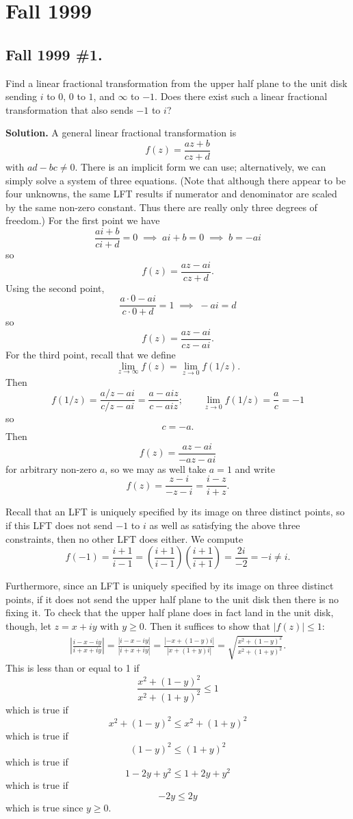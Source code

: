 \documentclass[10pt]{article}
\numberwithin{equation}{subsection}
\begin{document}
\newpage
\section{Fall 1999}

\subsection{Fall 1999 \#1.}

Find a linear fractional transformation from the upper half plane to the unit
disk sending $i$ to $0$, $0$ to $1$, and $\infty$ to $-1$.  Does there exist
such a linear fractional transformation that also sends $-1$ to $i$?

\textbf{Solution.}  A general linear fractional transformation is
$$
	f(z) = \frac{az+b}{cz+d}
$$
with $ad-bc\ne 0$.  There is an implicit form we can use; alternatively, we can
simply solve a system of three equations.  (Note that although there appear to
be four unknowns, the same LFT results if numerator and denominator are scaled
by the same non-zero constant.  Thus there are really only three degrees of
freedom.)  For the first point we have
$$
	\frac{ai+b}{ci+d} = 0 \;\implies\;
	ai+b = 0 \;\implies\;
	b = -ai
$$
so
$$
	f(z) = \frac{az-ai}{cz+d}.
$$
Using the second point,
$$
	\frac{a\cdot 0-ai}{c\cdot 0+d} = 1 \;\implies\;
	-ai = d
$$
so
$$
	f(z) = \frac{az-ai}{cz-ai}.
$$
For the third point, recall that we define
$$
	\lim_{z\to\infty}f(z) = \lim_{z\to 0}f(1/z).
$$
Then
$$
	f(1/z)
	= \frac{a/z-ai}{c/z-ai}
	= \frac{a-aiz}{c-aiz}; \qquad
	\lim_{z\to 0} f(1/z) = \frac{a}{c} = -1
$$
so
$$
	c = -a.
$$
Then
$$
	f(z) = \frac{az-ai}{-az-ai}
$$
for arbitrary non-zero $a$, so we may as well take $a=1$ and write
$$
	f(z) = \frac{z-i}{-z-i}
	= \frac{i-z}{i+z}.
$$

Recall that an LFT is uniquely specified by its image on three distinct
points, so if this LFT does not send $-1$ to $i$ as well as satisfying
the above three constraints, then no other LFT does either.  We compute
$$
	f(-1)
	= \frac{i+1}{i-1}
	= \left(\frac{i+1}{i-1}\right) \left(\frac{i+1}{i+1}\right)
	= \frac{2i}{-2} = -i \ne i.
$$

Furthermore, since an LFT is uniquely specified by its image on three distinct
points, if it does not send the upper half plane to the unit disk then there is
no fixing it.  To check that the upper half plane does in fact land in the unit
disk, though, let $z=x+iy$ with $y \ge 0$.  Then it suffices to show that
$|f(z)| \le 1$:
\begin{eqnarray*}
	\left| \frac{i-x-iy}{i+x+iy} \right|
	= \frac{|i-x-iy|}{|i+x+iy|}
	= \frac{|-x+(1-y)i|}{|x+(1+y)i|}
	= \sqrt{
		\frac{x^2 + (1-y)^2}{x^2 + (1+y)^2}
		}.
\end{eqnarray*}
This is less than or equal to 1 if
$$
	\frac{x^2 + (1-y)^2}{x^2 + (1+y)^2} \le 1
$$
which is true if
$$
	x^2 + (1-y)^2 \le x^2 + (1+y)^2
$$
which is true if
$$
	(1-y)^2 \le (1+y)^2
$$
which is true if
$$
	1 - 2y + y^2 \le 1 + 2y + y^2
$$
which is true if
$$
	- 2y \le 2y
$$
which is true since $y \ge 0$.
\end{document}
